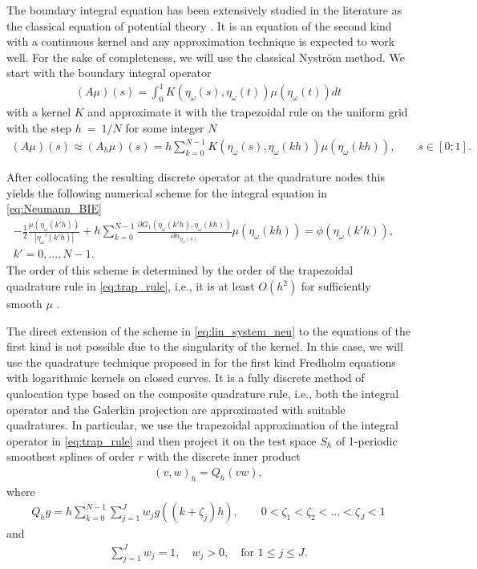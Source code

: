 The boundary integral equation \change{\eqref{eq:Neumann_BIE}} has been extensively studied in the literature as the classical equation of potential theory  \cite{Atkinson1991,Atkinson1997,GRAHAM1985,Jeon1997,Sloan2000,Cheng1993,Cheng1995}.
It is an equation of the second kind with a continuous kernel and any approximation technique is expected to work well.
For the sake of completeness, we will use the classical Nystr{\"o}m method. 
We start with the boundary integral operator 
\begin{align*}
	(A\mu)(s) = \int_0^1 K(\eta_{\omega}(s),\eta_{\omega}(t)) \mu(\eta_{\omega}(t)) dt
\end{align*}
with a kernel $K$ and approximate it with the trapezoidal rule on the uniform grid with the step $h~=~1/N$ for some integer $N$
\begin{align} \label{eq:trap_rule}
	(A\mu)(s) \approx (A_h \mu)(s) = h \sum_{k=0}^{N-1} K(\eta_{\omega}(s),\eta_{\omega}(kh)) \mu(\eta_{\omega}(kh)), 
	\qquad 
	s \in [0;1].
\end{align}


After collocating the resulting discrete operator at the quadrature nodes this yields the following numerical scheme for the integral equation in \eqref{eq:Neumann_BIE}
\begin{align}\label{eq:lin_system_neu}
    -\frac{1}{2} \frac{\mu(\eta_{\omega}(k'h))}{\left| \eta_{\omega}'(k'h) \right|} + h \sum_{k=0}^{N-1} \frac{\partial G_1(\eta_{\omega}(k'h),\eta_{\omega}(kh))}{\partial n_{\eta_{\omega}(s)}} \mu(\eta_{\omega}(kh))
    = \phi(\eta_{\omega}(k'h)),& 
    \\ \nonumber
	k' = 0,...,N-1.&
\end{align}
The order of this scheme is determined by the order of the trapezoidal quadrature rule in \eqref{eq:trap_rule}, i.e., it is at least $O(h^2)$ for sufficiently smooth $\mu$ \cite{Atkinson1997}.

The direct extension of the scheme in \eqref{eq:lin_system_neu} to the equations of the first kind is not possible due to the singularity of the kernel. 
In this case, we will use the quadrature technique proposed in \cite{Sloan1992} for the first kind Fredholm equations with logarithmic kernels on closed curves.
It is a fully discrete method of qualocation type based on the composite quadrature rule, i.e., both the integral operator and the Galerkin projection are approximated with suitable quadratures.
In particular, we use the trapezoidal approximation of the integral operator in \eqref{eq:trap_rule} and then project it on the test space $S_h$ of 1-periodic smoothest splines of order $r$ with the discrete inner product
\begin{align*}
	(v,w)_h = Q_h(v {w}),
\end{align*}
where
\begin{align*}
	Q_h g =  h \sum_{k=0}^{N-1} \sum_{j=1}^{J} w_j g((k+\zeta_j)h),
	\qquad
	0 < \zeta_1 < \zeta_2 < ... < \zeta_J < 1
\end{align*}
and
\begin{align*}
	\sum_{j=1}^J w_j = 1, 
	\quad
	w_j > 0,
	\quad
	\text{for } 1 \leq j \leq J.
\end{align*}

